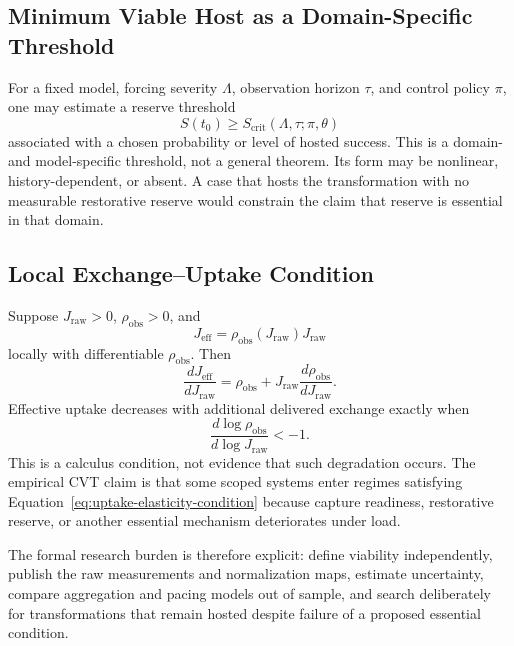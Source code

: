 \subsection{Minimum Viable Host as a Domain-Specific Threshold}

For a fixed model, forcing severity \(\Lambda\), observation horizon \(\tau\), and control policy \(\pi\), one may estimate a reserve threshold
\begin{equation}
    S(t_0)
    \geq
    S_{\mathrm{crit}}(\Lambda,\tau;\pi,\theta)
    \label{eq:minimum-host-threshold}
\end{equation}
associated with a chosen probability or level of hosted success. This is a domain- and model-specific threshold, not a general theorem. Its form may be nonlinear, history-dependent, or absent. A case that hosts the transformation with no measurable restorative reserve would constrain the claim that reserve is essential in that domain.

\subsection{Local Exchange--Uptake Condition}

Suppose \(J_{\mathrm{raw}}>0\), \(\rho_{\mathrm{obs}}>0\), and
\[
    J_{\mathrm{eff}}
    =
    \rho_{\mathrm{obs}}(J_{\mathrm{raw}})J_{\mathrm{raw}}
\]
locally with differentiable \(\rho_{\mathrm{obs}}\). Then
\begin{equation}
    \frac{dJ_{\mathrm{eff}}}{dJ_{\mathrm{raw}}}
    =
    \rho_{\mathrm{obs}}
    +
    J_{\mathrm{raw}}
    \frac{d\rho_{\mathrm{obs}}}{dJ_{\mathrm{raw}}}.
    \label{eq:exchange-uptake-derivative}
\end{equation}
Effective uptake decreases with additional delivered exchange exactly when
\begin{equation}
    \frac{d\log\rho_{\mathrm{obs}}}{d\log J_{\mathrm{raw}}}
    <
    -1.
    \label{eq:uptake-elasticity-condition}
\end{equation}
This is a calculus condition, not evidence that such degradation occurs. The empirical CVT claim is that some scoped systems enter regimes satisfying Equation~\eqref{eq:uptake-elasticity-condition} because capture readiness, restorative reserve, or another essential mechanism deteriorates under load.

The formal research burden is therefore explicit: define viability independently, publish the raw measurements and normalization maps, estimate uncertainty, compare aggregation and pacing models out of sample, and search deliberately for transformations that remain hosted despite failure of a proposed essential condition.
